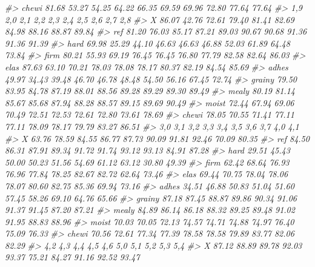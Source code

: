 \documentclass[
]{article}
\newenvironment{Shaded}{\begin{snugshade}}{\end{snugshade}}
\newcommand{\CommentTok}[1]{\textcolor[rgb]{0.56,0.35,0.01}{\textit{#1}}}
\begin{document}
\begin{Shaded}
\begin{Highlighting}[]
\CommentTok{\#\textgreater{} chewi   81.68  53.27  54.25  64.22  66.35  69.59  69.96  72.80  77.64  77.64}
\CommentTok{\#\textgreater{}           1,9    2,0    2,1    2,2    2,3    2,4    2,5    2,6    2,7    2,8}
\CommentTok{\#\textgreater{} X       86.07  42.76  72.61  79.40  81.41  82.69  84.98  88.16  88.87  89.84}
\CommentTok{\#\textgreater{} ref     81.20  76.03  85.17  87.21  89.03  90.67  90.68  91.36  91.36  91.39}
\CommentTok{\#\textgreater{} hard    69.98  25.29  44.10  46.63  46.63  46.88  52.03  61.89  64.48  73.84}
\CommentTok{\#\textgreater{} firm    80.21  55.93  69.19  76.45  76.45  76.80  77.79  82.58  82.64  86.03}
\CommentTok{\#\textgreater{} elas    87.63  63.10  70.21  78.03  78.08  78.17  80.37  82.19  84.54  85.69}
\CommentTok{\#\textgreater{} adhes   49.97  34.43  39.48  46.70  46.78  48.48  54.50  56.16  67.45  72.74}
\CommentTok{\#\textgreater{} grainy  79.50  83.95  84.78  87.19  88.01  88.56  89.28  89.29  89.30  89.49}
\CommentTok{\#\textgreater{} mealy   80.19  81.14  85.67  85.68  87.94  88.28  88.57  89.15  89.69  90.49}
\CommentTok{\#\textgreater{} moist   72.44  67.94  69.06  70.49  72.51  72.53  72.61  72.80  73.61  78.69}
\CommentTok{\#\textgreater{} chewi   78.05  70.55  71.41  77.11  77.11  78.09  78.17  79.79  83.27  86.51}
\CommentTok{\#\textgreater{}           3,0    3,1    3,2    3,3    3,4    3,5    3,6    3,7    4,0    4,1}
\CommentTok{\#\textgreater{} X       63.76  78.59  84.55  86.77  87.73  90.09  91.81  92.46  70.09  80.35}
\CommentTok{\#\textgreater{} ref     84.50  86.31  87.91  89.34  91.72  91.74  93.12  93.13  84.91  87.28}
\CommentTok{\#\textgreater{} hard    29.51  45.43  50.00  50.23  51.56  54.69  61.12  63.12  30.80  49.39}
\CommentTok{\#\textgreater{} firm    62.42  68.64  76.93  76.96  77.84  78.25  82.67  82.72  62.64  73.46}
\CommentTok{\#\textgreater{} elas    69.44  70.75  78.04  78.06  78.07  80.60  82.75  85.36  69.94  73.16}
\CommentTok{\#\textgreater{} adhes   34.51  46.88  50.83  51.04  51.60  57.45  58.26  69.10  64.76  65.66}
\CommentTok{\#\textgreater{} grainy  87.18  87.45  88.87  89.86  90.34  91.06  91.37  91.45  87.20  87.21}
\CommentTok{\#\textgreater{} mealy   84.89  86.14  86.18  88.32  89.25  89.48  91.02  91.95  88.83  88.96}
\CommentTok{\#\textgreater{} moist   70.03  70.05  72.13  74.57  74.71  74.88  74.97  76.40  75.09  76.33}
\CommentTok{\#\textgreater{} chewi   70.56  72.61  77.34  77.39  78.58  78.58  79.89  83.77  82.06  82.29}
\CommentTok{\#\textgreater{}           4,2    4,3    4,4    4,5    4,6    5,0    5,1    5,2    5,3    5,4}
\CommentTok{\#\textgreater{} X       87.12  88.89  89.78  92.03  93.37  75.21  84.27  91.16  92.52  93.47}

\end{Highlighting}
\end{Shaded}
\end{document}
